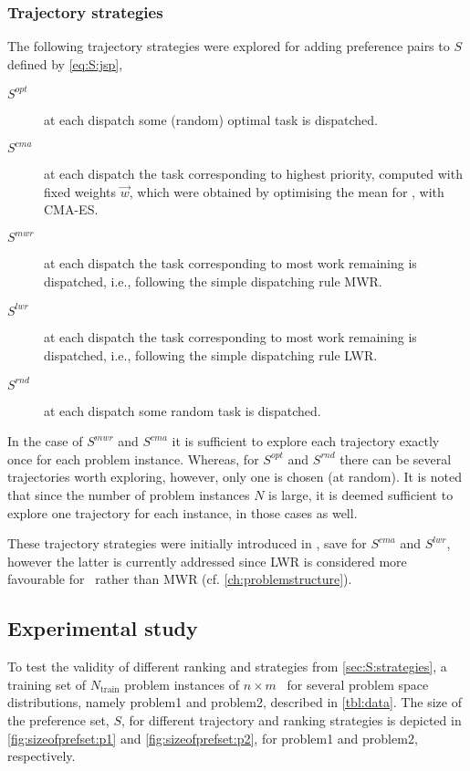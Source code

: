 \subsubsection{Trajectory strategies}
The following trajectory strategies were explored for adding preference pairs to $S$ defined by \cref{eq:S:jsp},
\begin{description}
\item[$S^{opt}$] at each dispatch some (random) optimal task is dispatched.
\item[$S^{cma}$] at each dispatch the task corresponding to highest priority, computed with fixed weights $\vec{w}$, which were obtained by optimising the mean for \fullnamerho, with CMA-ES. 
\item[$S^{mwr}$] at each dispatch the task corresponding to most work remaining is dispatched, i.e., following the simple dispatching rule MWR.
\item[$S^{lwr}$] at each dispatch the task corresponding to most work remaining is dispatched, i.e., following the simple dispatching rule LWR.
\item[$S^{rnd}$] at each dispatch some random task is dispatched.
\end{description}
In the case of $S^{mwr}$ and $S^{cma}$ it is sufficient to explore each trajectory exactly once for each problem instance. Whereas, for $S^{opt}$ and $S^{rnd}$ there can be several trajectories worth exploring, however, only one is chosen (at random). It is noted that since the number of problem instances $N$ is large, it is deemed sufficient to explore one trajectory for each instance, in those cases as well.

These trajectory strategies were initially introduced in \citet{InRu14b}, save for $S^{cma}$ and $S^{lwr}$, however the latter is currently addressed since LWR is considered more favourable for \FSP\ rather than MWR (cf. \cref{ch:problemstructure}). 

\subsection{Experimental study}\label{sec:expr:locallin}
To test the validity of different ranking and strategies from \cref{sec:S:strategies}, a training set of $N_{\text{train}}$ problem instances of $n\times m$ \jsp\ for several problem space distributions, namely problem{1} and problem{2}, described in \cref{tbl:data}. The size of the preference set, $S$, for different trajectory and ranking strategies is depicted in \cref{fig:sizeofprefset:p1} and  \cref{fig:sizeofprefset:p2}, for problem{1} and problem{2}, respectively. 

